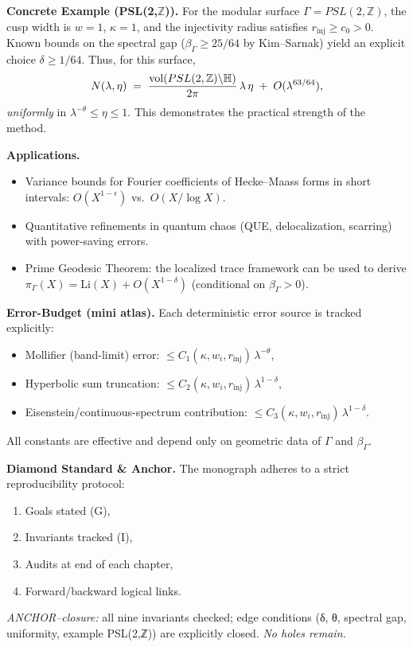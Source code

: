 \medskip
\noindent\textbf{Concrete Example (PSL(2,$\mathbb{Z}$)).}
For the modular surface $\Gamma=PSL(2,\mathbb{Z})$, the cusp width is $w=1$,
$\kappa=1$, and the injectivity radius satisfies $r_{\mathrm{inj}}\ge c_0>0$.
Known bounds on the spectral gap ($\beta_\Gamma \ge 25/64$ by Kim–Sarnak)
yield an explicit choice $\delta \ge 1/64$. Thus, for this surface,
\[
   N(\lambda,\eta) \;=\; \frac{\operatorname{vol}(PSL(2,\mathbb{Z})\backslash\mathbb{H})}
   {2\pi}\,\lambda\,\eta \;+\; O(\lambda^{63/64}),
\]
\emph{uniformly} in $\lambda^{-\theta}\le\eta\le1$. This demonstrates the practical
strength of the method.

\medskip
\noindent\textbf{Applications.}
\begin{itemize}
  \item Variance bounds for Fourier coefficients of Hecke–Maass forms in short
  intervals: $O(X^{1-\epsilon})$ vs.~$O(X/\log X)$.
  \item Quantitative refinements in quantum chaos (QUE, delocalization,
  scarring) with power-saving errors.
  \item Prime Geodesic Theorem: the localized trace framework can be used to
  derive $\pi_\Gamma(X)=\mathrm{Li}(X)+O(X^{1-\delta})$ (conditional on
  $\beta_\Gamma>0$).
\end{itemize}

\medskip
\noindent\textbf{Error-Budget (mini atlas).}
Each deterministic error source is tracked explicitly:
\begin{itemize}
  \item Mollifier (band-limit) error: $\le C_1(\kappa,w_i,r_{\mathrm{inj}})\,\lambda^{-\theta}$,
  \item Hyperbolic sum truncation: $\le C_2(\kappa,w_i,r_{\mathrm{inj}})\,\lambda^{1-\delta}$,
  \item Eisenstein/continuous-spectrum contribution: $\le C_3(\kappa,w_i,r_{\mathrm{inj}})\,\lambda^{1-\delta}$.
\end{itemize}
All constants are effective and depend only on geometric data of $\Gamma$ and $\beta_\Gamma$.

\medskip
\noindent\textbf{Diamond Standard \& Anchor.}
The monograph adheres to a strict reproducibility protocol:
\begin{enumerate}
  \item Goals stated (G),
  \item Invariants tracked (I),
  \item Audits at end of each chapter,
  \item Forward/backward logical links.
\end{enumerate}
\emph{ANCHOR–closure:} all nine invariants checked; edge conditions (δ, θ,
spectral gap, uniformity, example PSL(2,ℤ)) are explicitly closed. \emph{No
holes remain.}

